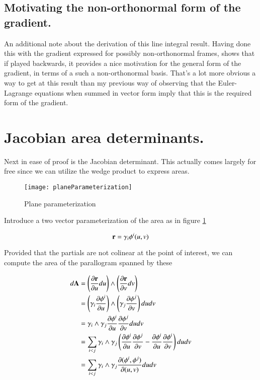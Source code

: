 \documentclass{article}
\newcommand{\PD}[2]{\frac{\partial {#2}}{\partial {#1}}}
\begin{document}
\subsection{ Motivating the non-orthonormal form of the gradient. }

An additional note about the derivation of this line integral result.  Having done this with the gradient expressed for possibly non-orthonormal frames, 
shows that if played backwards, it provides a nice motivation for the general form of the gradient, in terms
of a such a non-orthonormal basis.  That's a lot more obvious a way to get at this result than my previous way of observing that the Euler-Lagrange
equations when summed in vector form imply that this is the required form of the gradient.

\section{ Jacobian area determinants. }

Next in ease of proof is the Jacobian determinant.  This actually comes largely for free since we can utilize the wedge product to
express areas.

\begin{figure}[htp]
\centering
\texttt{[image: planeParameterization]}
\caption{Plane parameterization}\label{fig:planeParameterization}
\end{figure}

Introduce a two vector parameterization of the area as in figure \ref{fig:planeParameterization}

\begin{equation*}
\mathbf{r} = \gamma_{i} \phi^i(u,v)
\end{equation*}

Provided that the partials are not colinear at the point of interest, we can compute the area of the parallogram spanned by these

\begin{align*}
d\BA 
&= \left(\PD{u}{\Br} du\right) \wedge \left(\PD{v}{\Br} dv\right) \\
&= \left(\gamma_{i} \PD{u}{\phi^i}\right) \wedge \left(\gamma_{j} \PD{v}{\phi^j} \right) du dv \\
&= \gamma_{i} \wedge \gamma_{j} \PD{u}{\phi^i} \PD{v}{\phi^j} du dv \\
&= \sum_{i<j} \gamma_{i} \wedge \gamma_{j} \left( \PD{u}{\phi^i} \PD{v}{\phi^j} - \PD{u}{\phi^i} \PD{v}{\phi^i} \right) du dv \\
&= \sum_{i<j} \gamma_{i} \wedge \gamma_{j} \PD{(u,v)}{(\phi^i,\phi^j)} du dv \\
\end{align*}
\end{document}
